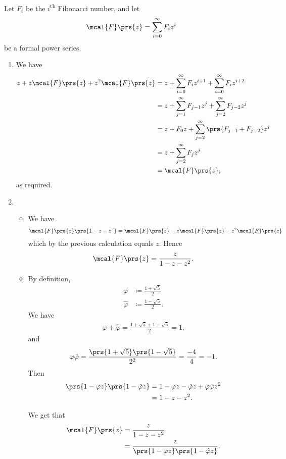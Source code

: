 \documentclass[oneside]{scrbook}
\theoremstyle{definition}
\begin{document}
\begin{problem}
Let $F_i$ be the $i$\textsuperscript{th} Fibonacci number, and let \[\mcal{F}\prs{z} = \sum_{i=0}^{\infty} F_i z^i\]
be a formal power series.
\begin{enumerate}[label=\alph*.]
\item %
We have
\begin{align*}
z + z \mcal{F}\prs{z} + z^2 \mcal{F}\prs{z} &= z + \sum_{i=0}^{\infty} F_i z^{i+1} + \sum_{i=0}^{\infty} F_i z^{i+2} \\&=
z + \sum_{j=1}^{\infty} F_{j-1} z^j + \sum_{j=2}^{\infty} F_{j-2} z^j
\\&=
z + F_0 z + \sum_{j=2}^{\infty} \prs{F_{j-1} + F_{j-2}} z^j
\\&=
z + \sum_{j=2}^{\infty} F_j z^j
\\&=
\mcal{F}\prs{z} \text{,}
\end{align*}
as required.

\item
\begin{itemize}
\item We have
\[\mcal{F}\prs{z} \prs{1 - z - z^2} = \mcal{F}\prs{z} - z \mcal{F}\prs{z} - z^2\mcal{F}\prs{z}\]
which by the previous calculation equals $z$. Hence
\begin{align*}
\mcal{F}\prs{z} = \frac{z}{1 - z - z^2} \text{.}
\end{align*}

\item By definition,
\begin{align*}
\varphi &\coloneqq \frac{1 + \sqrt{5}}{2} \\
\hat{\varphi} &\coloneqq \frac{1 - \sqrt{5}}{2} \text{.}
\end{align*}
We have
\begin{align*}
\varphi + \hat{\varphi} = \frac{1 + \sqrt{5} + 1 - \sqrt{5}}{2} = 1 \text{,}
\end{align*}
and
\begin{align*}
\varphi \hat{\varphi} = \frac{\prs{1 + \sqrt{5}}\prs{1 - \sqrt{5}}}{2^2} = \frac{-4}{4} = -1 \text{.}
\end{align*}
Then
\begin{align*}
\prs{1 - \varphi z} \prs{1 - \hat{\varphi} z} &= 1 - \varphi z - \hat{\varphi}z + \varphi \hat{\varphi} z^2
\\&= 1 - z - z^2 \text{.}
\end{align*}

We get that
\begin{align*}
\mcal{F}\prs{z} &= \frac{z}{1 - z - z^2}
\\&= \frac{z}{\prs{1 - \varphi z}\prs{1 - \hat{\varphi} z}} \text{.}
\end{align*}


\end{itemize}
\end{enumerate}
\end{problem}
\end{document}
